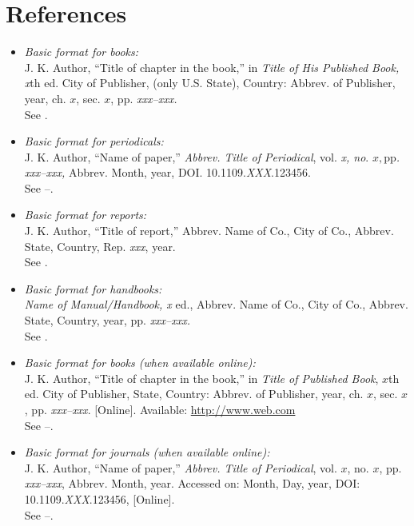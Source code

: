 \documentclass[journal,twoside,web]{ieeecolor}
\begin{document}
\section{References}

\begin{itemize}

    \item \emph{Basic format for books:}\\
          J. K. Author, ``Title of chapter in the book,'' in \emph{Title of His Published Book, x}th ed. City of Publisher, (only U.S. State), Country: Abbrev. of Publisher, year, ch. $x$, sec. $x$, pp. \emph{xxx--xxx.}\\
          See \cite{b1,b2}.

    \item \emph{Basic format for periodicals:}\\
          J. K. Author, ``Name of paper,'' \emph{Abbrev. Title of Periodical}, vol. \emph{x, no}. $x, $pp\emph{. xxx--xxx, }Abbrev. Month, year, DOI. 10.1109.\emph{XXX}.123456.\\
          See \cite{b3}--\cite{b5}.

    \item \emph{Basic format for reports:}\\
          J. K. Author, ``Title of report,'' Abbrev. Name of Co., City of Co., Abbrev. State, Country, Rep. \emph{xxx}, year.\\
          See \cite{b6,b7}.

    \item \emph{Basic format for handbooks:}\\
          \emph{Name of Manual/Handbook, x} ed., Abbrev. Name of Co., City of Co., Abbrev. State, Country, year, pp. \emph{xxx--xxx.}\\
          See \cite{b8,b9}.

    \item \emph{Basic format for books (when available online):}\\
          J. K. Author, ``Title of chapter in the book,'' in \emph{Title of
              Published Book}, $x$th ed. City of Publisher, State, Country: Abbrev.
          of Publisher, year, ch. $x$, sec. $x$, pp. \emph{xxx--xxx}. [Online].
          Available: \underline{http://www.web.com}\\
          See \cite{b10}--\cite{b13}.

    \item \emph{Basic format for journals (when available online):}\\
          J. K. Author, ``Name of paper,'' \emph{Abbrev. Title of Periodical}, vol. $x$, no. $x$, pp. \emph{xxx--xxx}, Abbrev. Month, year. Accessed on: Month, Day, year, DOI: 10.1109.\emph{XXX}.123456, [Online].\\
          See \cite{b14}--\cite{b16}.


\end{itemize}
\end{document}
